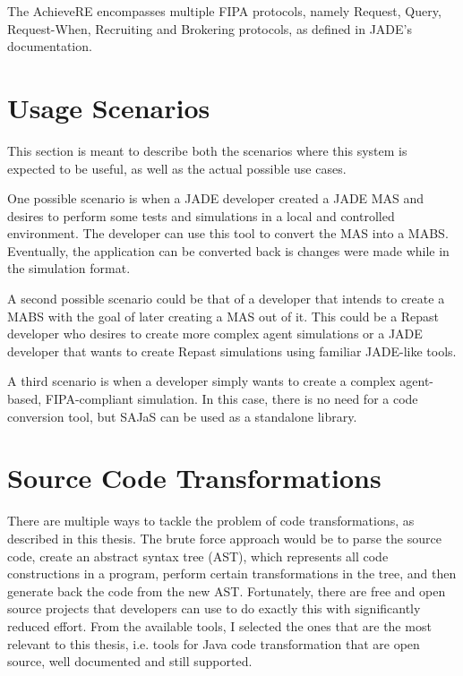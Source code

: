 The AchieveRE encompasses multiple \gls{FIPA} protocols, namely Request, Query, Request-When, Recruiting and Brokering protocols, as defined in JADE's documentation.

\section{Usage Scenarios}
\label{sec:solution-scenarios}
This section is meant to describe both the scenarios where this system is expected to be useful, as well as the actual possible use cases.

One possible scenario is when a JADE developer created a JADE MAS and desires to perform some tests and simulations in a local and controlled environment. The developer can use this tool to convert the MAS into a MABS. Eventually, the application can be converted back is changes were made while in the simulation format.

A second possible scenario could be that of a developer that intends to create a MABS with the goal of later creating a MAS out of it. This could be a Repast developer who desires to create more complex agent simulations or a JADE developer that wants to create Repast simulations using familiar JADE-like tools.

A third scenario is when a developer simply wants to create a complex agent-based, FIPA-compliant simulation. In this case, there is no need for a code conversion tool, but SAJaS can be used as a standalone library.

\section{Source Code Transformations}
\label{sec:solution-codeGeneration}

There are multiple ways to tackle the problem of code transformations, as described in this thesis. The brute force approach would be to parse the source code, create an abstract syntax tree (AST), which represents all code constructions in a program, perform certain transformations in the tree, and then generate back the code from the new AST. Fortunately, there are free and open source projects that developers can use to do exactly this with significantly reduced effort. From the available tools, I selected the ones that are the most relevant to this thesis, i.e. tools for Java code transformation that are open source, well documented and still supported.


